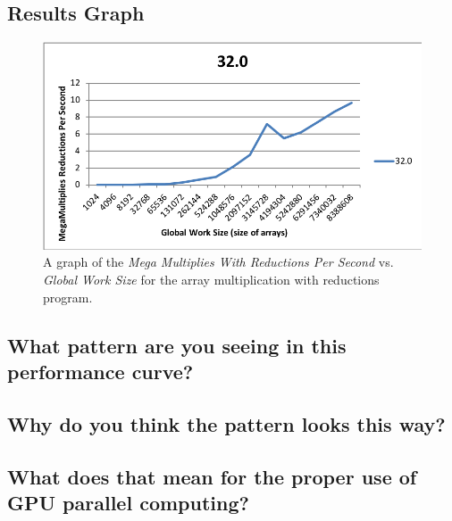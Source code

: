 \documentclass[onecolumn,draftclsnofoot, 10pt, compsoc]{IEEEtran}
\begin{document}
	\subsection{Results Graph}
		\begin{figure}[H]
			\includegraphics[width=16cm]{multRedMegasVsGlobal}
			\centering
			\caption{A graph of the \textit{Mega Multiplies With Reductions Per Second} vs. \textit{Global Work Size} for the array multiplication with reductions program.}
		\end{figure}




	
	
	
	\subsection{What pattern are you seeing in this performance curve?}
	
	
	
	
	
	
	
	
	
	\subsection{Why do you think the pattern looks this way?}
	
	
	
	
	
	
	
	
	
	\subsection{What does that mean for the proper use of GPU parallel computing?}
	
\end{document}
